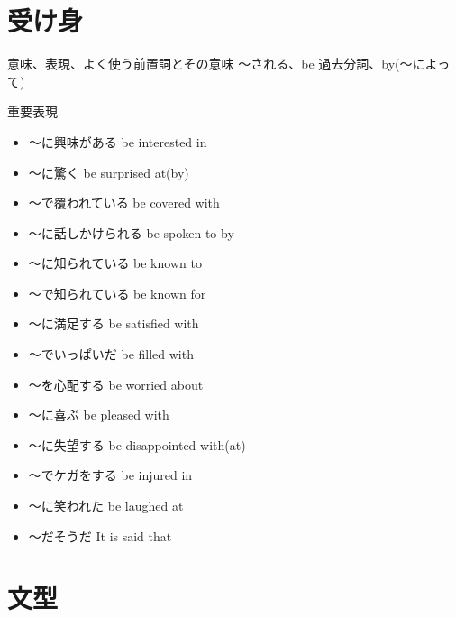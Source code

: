 \documentclass[10pt]{jsarticle}
\newcommand{\answer}[2]{{\color{orange}#2}}
\newcommand{\answer}[2]{\vspace{#1mm}}
\begin{document}
\section{受け身}

\begin{itembox}[l]{意味、表現、よく使う前置詞とその意味}
	\answer{10}{〜される、be 過去分詞、by(〜によって)}
\end{itembox}

\begin{itembox}[l]{重要表現}
	\begin{multicols}{2}
		\begin{itemize}
			\item 〜に興味がある \answer{5}{be interested in}
			\item 〜に驚く \answer{5}{be surprised at(by)}
			\item 〜で覆われている \answer{5}{be covered with}
			\item 〜に話しかけられる \answer{5}{be spoken to by}
			\item 〜に知られている \answer{5}{be known to}
			\item 〜で知られている \answer{5}{be known for}
			\item 〜に満足する \answer{5}{be satisfied with}
			\item 〜でいっぱいだ \answer{5}{be filled with}
			\item 〜を心配する \answer{5}{be worried about}
			\item 〜に喜ぶ \answer{5}{be pleased with}
			\item 〜に失望する \answer{5}{be disappointed with(at)}
			\item 〜でケガをする \answer{5}{be injured in}
			\item 〜に笑われた \answer{5}{be laughed at}
			\item 〜だそうだ \answer{5}{It is said that }
		\end{itemize}
	\end{multicols}
\end{itembox}

\newpage

\section{文型}
\vspace{-10mm}
\end{document}
